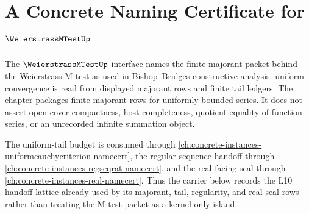 \chapter{A Concrete Naming Certificate for $\WeierstrassMTestUp$}
\label{ch:concrete-instances-weierstrassmtest-namecert}

The $\WeierstrassMTestUp$ interface names the finite majorant packet behind the Weierstrass M-test as used in Bishop--Bridges constructive analysis: uniform convergence is read from displayed majorant rows and finite tail ledgers. The chapter packages finite majorant rows for uniformly bounded series. It does not assert open-cover compactness, host completeness, quotient equality of function series, or an unrecorded infinite summation object.

The uniform-tail budget is consumed through \autoref{ch:concrete-instances-uniformcauchycriterion-namecert}, the regular-sequence handoff through \autoref{ch:concrete-instances-regseqrat-namecert}, and the real-facing seal through \autoref{ch:concrete-instances-real-namecert}. Thus the carrier below records the L10 handoff lattice already used by its majorant, tail, regularity, and real-seal rows rather than treating the M-test packet as a kernel-only island.

